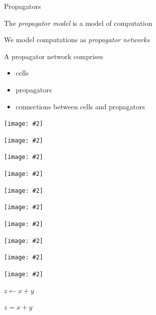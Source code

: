 \documentclass[usenames,dvipsnames,svgnames,table,aspectratio=1610,mathserif]{beamer}
\newcommand{\nl}{\vspace{\baselineskip}}
\newcommand{\imageslide}[2][1]{{
\begin{frame}\begin{center}
\texttt{[image: \#2]}
\end{center}\end{frame}
}}
\begin{document}


\begin{frame}

\begin{center}
{\Huge Propagators}
\end{center}

\end{frame}


\begin{frame}
The {\it propagator model} is a model of computation

\nl

We model computations as {\it propagator networks}
\end{frame}


\begin{frame}

A propagator network comprises
\begin{itemize}
\item cells
\item propagators
\item connections between cells and propagators
\end{itemize}

\end{frame}


\imageslide{diagrams/cell1.pdf}
\imageslide{diagrams/cell2.pdf}
\imageslide{diagrams/prop.pdf}


\imageslide{diagrams/upper1.pdf}
\imageslide{diagrams/upper2.pdf}
\imageslide{diagrams/upper3.pdf}

\imageslide{diagrams/add1.pdf}
\imageslide{diagrams/add2.pdf}
\imageslide{diagrams/add3.pdf}
\imageslide{diagrams/add4.pdf}




\begin{frame}
  \begin{center}
    \begin{LARGE}
      $z \leftarrow x + y$
    \end{LARGE}
  \end{center}
\end{frame}


\begin{frame}
  \begin{center}
    \begin{LARGE}
      $z = x + y$
    \end{LARGE}
  \end{center}
\end{frame}
\end{document}
